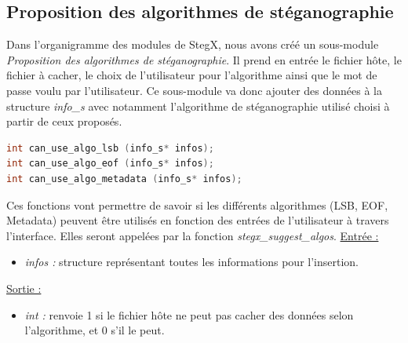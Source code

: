 \documentclass[11pt]{article}
\begin{document}


\subsection{Proposition des algorithmes 
de stéganographie}

Dans l'organigramme des modules de StegX, nous avons créé un sous-module 
\textit{Proposition des algorithmes de stéganographie}. Il prend en entrée 
le fichier hôte, le fichier à cacher, le choix de l'utilisateur pour 
l'algorithme ainsi que le mot de passe voulu par l'utilisateur. 
Ce sous-module va donc ajouter des données à la structure \textit{info\_s} 
avec notamment l'algorithme de stéganographie utilisé choisi à partir de ceux 
proposés. 

\begin{lstlisting}[language=c]
int can_use_algo_lsb (info_s* infos);
int can_use_algo_eof (info_s* infos);
int can_use_algo_metadata (info_s* infos);
\end{lstlisting}

Ces fonctions vont permettre de savoir si les différents algorithmes 
(LSB, EOF, Metadata) peuvent être utilisés en fonction des entrées 
de l'utilisateur à travers l'interface. 
Elles seront appelées par la fonction \textit{stegx\_suggest\_algos}. 
\newline
\underline{Entrée :} 
\begin{itemize}
\item \textit{infos :} structure représentant toutes les informations pour 
l'insertion.  
\end{itemize}
\underline{Sortie :} 
\begin{itemize}
\item \textit{int :} renvoie 1 si le fichier hôte ne peut pas cacher des 
données selon l'algorithme, et 0 s'il le peut. 
\newline 
\end{itemize}
\end{document}
